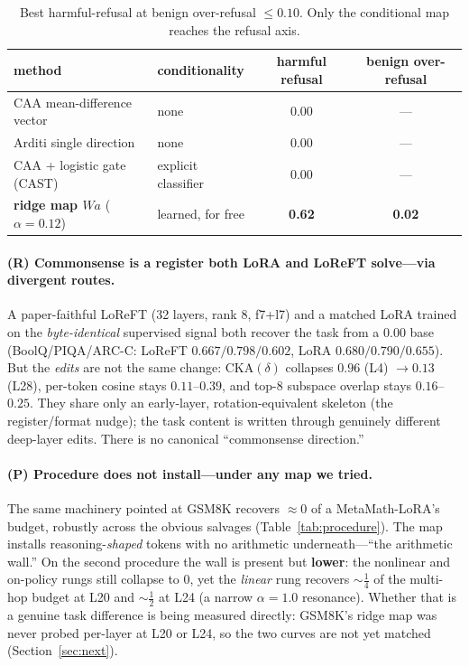 \documentclass{article}
\begin{document}
\begin{table}[h]
\centering
\caption{Best harmful-refusal at benign over-refusal $\leq 0.10$. Only the conditional map reaches the
refusal axis.}
\label{tab:refusal}
\small
\setlength{\tabcolsep}{5pt}
\begin{tabular}{llcc}
\toprule
method & conditionality & harmful refusal & benign over-refusal \\
\midrule
CAA mean-difference vector & none & 0.00 & --- \\
Arditi single direction & none & 0.00 & --- \\
CAA + logistic gate (CAST) & explicit classifier & 0.00 & --- \\
\textbf{ridge map $W a$} ($\alpha{=}0.12$) & learned, for free & \textbf{0.62} & \textbf{0.02} \\
\bottomrule
\end{tabular}
\end{table}

\paragraph{(R) Commonsense is a register both LoRA and LoReFT solve---via divergent routes.}
A paper-faithful LoReFT (32 layers, rank 8, f7+l7) and a matched LoRA trained on the
\emph{byte-identical} supervised signal both recover the task from a $0.00$ base (BoolQ/PIQA/ARC-C:
LoReFT $0.667/0.798/0.602$, LoRA $0.680/0.790/0.655$). But the \emph{edits} are not the same change:
$\mathrm{CKA}(\delta)$ collapses $0.96$ (L4) $\to 0.13$ (L28), per-token cosine stays $0.11$--$0.39$,
and top-8 subspace overlap stays $0.16$--$0.25$. They share only an early-layer, rotation-equivalent
skeleton (the register/format nudge); the task content is written through genuinely different
deep-layer edits. There is no canonical ``commonsense direction.''

\paragraph{(P) Procedure does not install---under any map we tried.}
The same machinery pointed at GSM8K recovers $\approx 0$ of a MetaMath-LoRA's budget, robustly across
the obvious salvages (Table~\ref{tab:procedure}). The map installs reasoning-\emph{shaped} tokens with
no arithmetic underneath---``the arithmetic wall.'' On the second procedure the wall is present but
\textbf{lower}: the nonlinear and on-policy rungs still collapse to 0, yet the \emph{linear} rung
recovers ${\sim}\frac{1}{4}$ of the multi-hop budget at L20 and ${\sim}\frac{1}{2}$ at L24 (a narrow
$\alpha = 1.0$ resonance). Whether that is a genuine task difference is being measured directly:
GSM8K's ridge map was never probed per-layer at L20 or L24, so the two curves are not yet matched
(Section~\ref{sec:next}).
\end{document}
